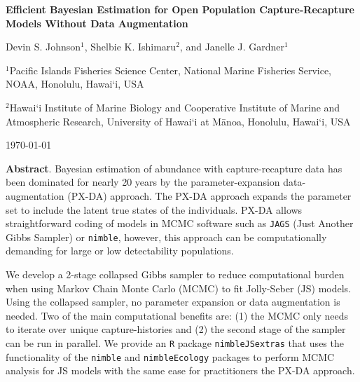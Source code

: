 \documentclass[12pt]{article}
\begin{document}


\setlength{\parindent}{0pt}
\renewcommand{\baselinestretch}{2}\normalsize


{\Large \bf Efficient Bayesian Estimation for Open Population Capture-Recapture Models Without Data Augmentation} 

\bigskip\bigskip


{\large Devin S. Johnson$^1$, Shelbie K. Ishimaru$^2$, and Janelle J. Gardner$^1$} \bigskip

$^1$Pacific Islands Fisheries Science Center, National Marine Fisheries Service, NOAA, Honolulu, Hawai`i, USA \bigskip
 
$^2$Hawai`i Institute of Marine Biology and Cooperative Institute of Marine and Atmospheric Research, University of Hawai`i at Mānoa, Honolulu, Hawai`i, USA \bigskip

\today

\bigskip\bigskip



%


\linenumbers


{\bf Abstract}. Bayesian estimation of abundance with capture-recapture data has been dominated for nearly 20 years by the parameter-expansion data-augmentation (PX-DA) approach. The PX-DA approach expands the parameter set to include the latent true states of the individuals. PX-DA allows straightforward coding of models in MCMC software such as \verb|JAGS| (Just Another Gibbs Sampler) or \verb|nimble|, however, this approach can be computationally demanding for large or low detectability populations. 

We develop a 2-stage collapsed Gibbs sampler to reduce computational burden when using Markov Chain Monte Carlo (MCMC) to fit Jolly-Seber (JS) models. Using the collapsed sampler, no parameter expansion or data augmentation is needed. Two of the main computational benefits are: (1) the MCMC only needs to iterate over unique capture-histories and (2) the second stage of the sampler can be run in parallel. We provide an {\tt R} package \verb|nimbleJSextras| that uses the functionality of the \verb|nimble| and \verb|nimbleEcology| packages to perform MCMC analysis for JS models with the same ease for practitioners the PX-DA approach.  
\end{document}
